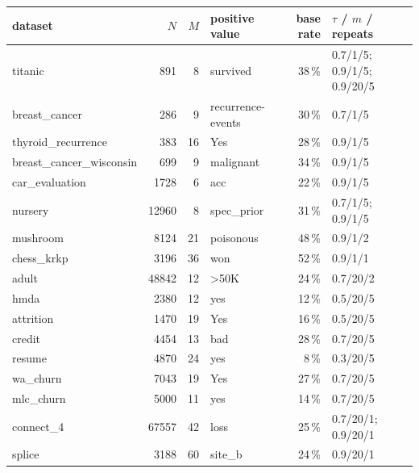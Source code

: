 \begin{tabular}{lrrlrl}
\toprule
dataset & $N$ & $M$ & positive value & base rate & $\tau$ / $m$ / repeats\\
\midrule
titanic & 891 & 8 & survived & 38\,\% & 0.7/1/5; 0.9/1/5; 0.9/20/5\\
breast\_cancer & 286 & 9 & recurrence-events & 30\,\% & 0.7/1/5\\
thyroid\_recurrence & 383 & 16 & Yes & 28\,\% & 0.9/1/5\\
breast\_cancer\_wisconsin & 699 & 9 & malignant & 34\,\% & 0.9/1/5\\
car\_evaluation & 1728 & 6 & acc & 22\,\% & 0.9/1/5\\
nursery & 12960 & 8 & spec\_prior & 31\,\% & 0.7/1/5; 0.9/1/5\\
mushroom & 8124 & 21 & poisonous & 48\,\% & 0.9/1/2\\
chess\_krkp & 3196 & 36 & won & 52\,\% & 0.9/1/1\\
adult & 48842 & 12 & >50K & 24\,\% & 0.7/20/2\\
hmda & 2380 & 12 & yes & 12\,\% & 0.5/20/5\\
attrition & 1470 & 19 & Yes & 16\,\% & 0.5/20/5\\
credit & 4454 & 13 & bad & 28\,\% & 0.7/20/5\\
resume & 4870 & 24 & yes & 8\,\% & 0.3/20/5\\
wa\_churn & 7043 & 19 & Yes & 27\,\% & 0.7/20/5\\
mlc\_churn & 5000 & 11 & yes & 14\,\% & 0.7/20/5\\
connect\_4 & 67557 & 42 & loss & 25\,\% & 0.7/20/1; 0.9/20/1\\
splice & 3188 & 60 & site\_b & 24\,\% & 0.9/20/1\\
\bottomrule
\end{tabular}

